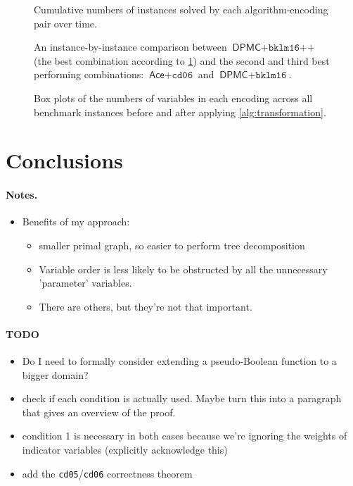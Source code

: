 \documentclass[runningheads]{llncs}
\begin{document}
\begin{figure}
  \centering
  \caption{Cumulative numbers of instances solved by each algorithm-encoding
    pair over time.}
  \label{fig:cumulative}
\end{figure}

\begin{figure}
  \centering
  \caption{An instance-by-instance comparison between $\textsf{DPMC} +
    \texttt{bklm16++}$ (the best combination according to \cref{fig:cumulative})
  and the second and third best performing combinations: $\textsf{Ace} +
  \texttt{cd06}$ and $\textsf{DPMC} + \texttt{bklm16}$.}
  \label{fig:scatter}
\end{figure}

\begin{figure}
  \centering
  \caption{Box plots of the numbers of variables in each encoding across all
    benchmark instances before and after applying \cref{alg:transformation}.}
  \label{fig:box}
\end{figure} %

\section{Conclusions}

\paragraph{Notes.}
\begin{itemize}
\item Benefits of my approach:
  \begin{itemize}
  \item smaller primal graph, so easier to perform tree decomposition
  \item Variable order is less likely to be obstructed by all the unnecessary
    'parameter' variables.
  \item There are others, but they're not that important.
  \end{itemize}
\end{itemize}

\paragraph{TODO}
\begin{itemize}
\item Do I need to formally consider extending a pseudo-Boolean function to a
  bigger domain?
\item check if each condition is actually used. Maybe turn this into a paragraph
  that gives an overview of the proof.
\item condition 1 is necessary in both cases because we're ignoring the weights
  of indicator variables (explicitly acknowledge this)
\item add the \texttt{cd05}/\texttt{cd06} correctness theorem
\end{itemize}



\end{document}
